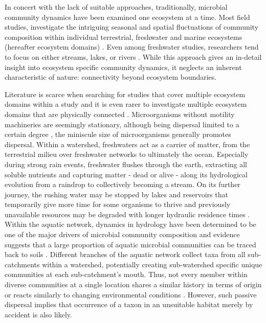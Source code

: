 \documentclass[12pt,a4paper]{article} %
\begin{document}
In concert with the lack of suitable approaches, traditionally, microbial community dynamics have been examined one ecosystem at a time. Most field studies, investigate the intriguing seasonal and spatial fluctuations of community composition within individual terrestrial, freshwater and marine ecosystems (hereafter ecosystem domains) \citep{Shigyo2019,Jones2012,Hassell2018,Giovannoni2012}. Even among freshwater studies, researchers tend to focus on either streams, lakes, or rivers \citep{Logue2008}. While this approach gives an in-detail insight into ecosystem specific community dynamics, it neglects an inherent characteristic of nature: connectivity beyond ecosystem boundaries.

Literature is scarce when searching for studies that cover multiple ecosystem domains within a study \citep{Nemergut2011, Shade2013} and it is even rarer to investigate multiple ecosystem domains that are physically connected \citep{Ruiz-Gonzalez2015, Hauptmann2016, Doherty2017}. Microorganisms without motility machineries are seemingly stationary, although being dispersal limited to a certain degree \citep{Hanson2012}, the miniscule size of microorganisms generally promotes dispersal. Within a watershed, freshwaters act as a carrier of matter, from the terrestrial milieu over freshwater networks to ultimately the ocean. Especially during strong rain events, freshwater flushes through the earth, extracting all soluble nutrients and capturing matter - dead or alive - along its hydrological evolution from a raindrop to collectively becoming a stream. On its further journey, the rushing water may be stopped by lakes and reservoirs that temporarily give more time for some organisms to thrive and previously unavailable resources may be degraded with longer hydraulic residence times \citep{Catalan2016a}. Within the aquatic network, dynamics in hydrology have been determined to be one of the major drivers of microbial community composition \citep{Nino-Garcia2016} and evidence suggests that a large proportion of aquatic microbial communities can be traced back to soils \citep{Crump2012, Besemer2013, Ruiz-Gonzalez2015, Hauptmann2016}. Different branches of the aquatic network collect taxa from all sub-catchments within a watershed, potentially creating sub-watershed specific unique communities at each sub-catchment's mouth. Thus, not every member within diverse communities at a single location shares a similar history in terms of origin \citep{Nino-Garcia2016, Comte2017} or reacts similarly to changing environmental conditions \citep{Fierer2007}. However, such passive dispersal implies that occurrence of a taxon in an unsuitable habitat merely by accident is also likely.
\end{document}
